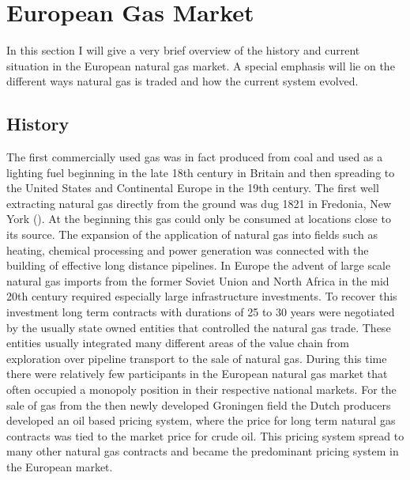 \chapter{European Gas Market}
In this section I will give a very brief overview of the history and current situation in the European natural gas market. A special emphasis will lie on the different ways natural gas is traded and how the current system  evolved. 

\section{History}
The first commercially used gas was in fact produced from coal and used as a lighting fuel beginning in the late 18th century in Britain and then spreading to the United States and Continental Europe in the 19th century. The first well extracting natural gas directly from the ground was dug 1821 in Fredonia, New York (\cite{heather_evolution_2015}). At the beginning this gas could only be consumed at locations close to its source. The expansion of the application of natural gas into fields such as heating, chemical processing and power generation was connected with the building of effective long distance pipelines. In Europe the advent of large scale natural gas imports from the former Soviet Union and North Africa in the mid 20th century required especially large infrastructure investments. To recover this investment  long term contracts with durations of 25 to 30 years were negotiated by the usually state owned entities that controlled the natural gas trade. These entities usually integrated many different areas of the value chain from exploration over pipeline transport to the sale of natural gas. During this time there were relatively few participants in the European natural gas market that often occupied a monopoly position in their respective national markets.
For the sale of gas from the then newly developed Groningen field  the Dutch producers developed an oil based pricing system, where the price for long term natural gas contracts was tied to the market price for crude oil. This pricing system spread to many other natural gas contracts and became the predominant pricing system in the European market.
